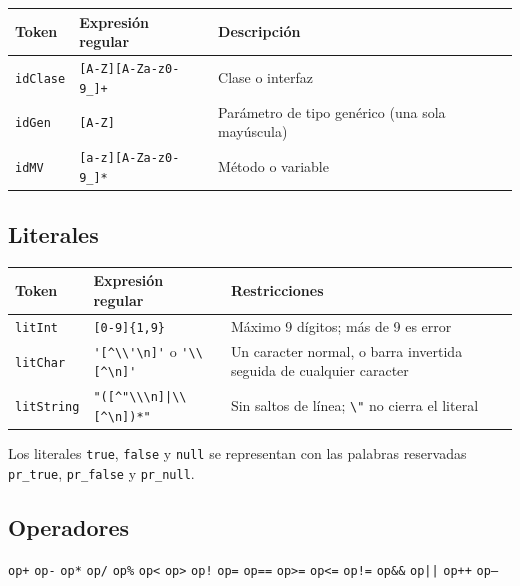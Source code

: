 \documentclass[11pt,a4paper]{article}
\begin{document}
\begin{center}
\begin{tabular}{|l|l|l|}
\hline
\textbf{Token} & \textbf{Expresión regular} & \textbf{Descripción} \\ \hline
\texttt{idClase} & \verb![A-Z][A-Za-z0-9_]+! & Clase o interfaz \\ \hline
\texttt{idGen} & \texttt{[A-Z]} & Parámetro de tipo genérico (una sola mayúscula) \\ \hline
\texttt{idMV} & \verb![a-z][A-Za-z0-9_]*! & Método o variable \\ \hline
\end{tabular}
\end{center}

\subsection{Literales}

\begin{center}
{\footnotesize
\setlength{\tabcolsep}{4pt}
\begin{tabular}{|l|l|p{5.5cm}|}
\hline
\textbf{Token} & \textbf{Expresión regular} & \textbf{Restricciones} \\ \hline
\texttt{litInt} & \verb![0-9]{1,9}! & Máximo 9 dígitos; más de 9 es error \\ \hline
\texttt{litChar} & \verb!'[^\\'\n]'! o \verb!'\\[^\n]'! &
  Un caracter normal, o barra invertida seguida de cualquier caracter \\ \hline
\texttt{litString} & \verb!"([^"\\\n]|\\[^\n])*"! &
  Sin saltos de línea; \verb!\"! no cierra el literal \\ \hline
\end{tabular}
}
\end{center}

Los literales \texttt{true}, \texttt{false} y \texttt{null} se representan con las palabras reservadas
\verb!pr_true!, \verb!pr_false! y \verb!pr_null!.

\subsection{Operadores}

\noindent
\texttt{op+} \texttt{op-} \texttt{op*} \texttt{op/} \texttt{op\%} \texttt{op<} \texttt{op>}
\texttt{op!} \texttt{op=} \texttt{op==} \texttt{op>=} \texttt{op<=} \texttt{op!=}
\texttt{op\&\&} \verb!op||! \texttt{op++} \texttt{op--}
\end{document}
